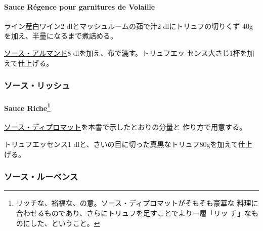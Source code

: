 \begin{recette}
\hypertarget{sauce-ruxe9gence-pour-garnitures-de-volaille}{%
\paragraph{Sauce Régence pour garnitures de
Volaille}\label{sauce-ruxe9gence-pour-garnitures-de-volaille}}


ライン産白ワイン2 dlとマッシュルームの茹で汁2 dlにトリュフの切りくず
40gを加え、半量になるまで煮詰める。

\protect\hyperlink{sauce-allemande}{ソース・アルマンド}8
dlを加え、布で漉す。トリュフエッ センス大さじ1杯を加えて仕上げる。

\hypertarget{ux30bdux30fcux30b9ux30eaux30c3ux30b7ux30e5}{%
\subsubsection{ソース・リッシュ}\label{ux30bdux30fcux30b9ux30eaux30c3ux30b7ux30e5}}

\hypertarget{sauce-riche121}{%
\paragraph[Sauce Riche]{\texorpdfstring{Sauce Riche\footnote{リッチな、裕福な、の意。ソース・ディプロマットがそもそも豪華な
  料理に合わせるものであり、さらにトリュフを足すことでより一層「リッ
  チ」なものにした、ということ。}}{Sauce Riche}}\label{sauce-riche121}}

 

\protect\hyperlink{sauce-diplomate}{ソース・ディプロマット}を本書で示したとおりの分量と
作り方で用意する。

トリュフエッセンス1
dlと、さいの目に切った真黒なトリュフ80gを加えて仕上げる。

\maeaki

\hypertarget{ux30bdux30fcux30b9ux30ebux30fcux30d9ux30f3ux30b9}{%
\subsubsection{ソース・ルーベンス}\label{ux30bdux30fcux30b9ux30ebux30fcux30d9ux30f3ux30b9}}


\end{recette}
